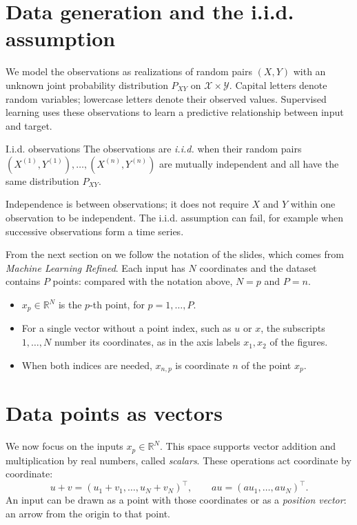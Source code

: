 \documentclass[a4paper,12pt,oneside]{report}
\begin{document}
\section{Data generation and the i.i.d. assumption}

We model the observations as realizations of random pairs $(X,Y)$
with an unknown joint probability distribution $P_{XY}$ on
$\mathcal{X}\times\mathcal{Y}$. Capital letters denote random variables;
lowercase letters denote their observed values. Supervised learning
uses these observations to learn a predictive relationship between
input and target.

\begin{frameddefn}{I.i.d. observations}
\label{def:iid}
The observations are \emph{i.i.d.} when their random pairs
$(X^{(1)},Y^{(1)}),\ldots,(X^{(n)},Y^{(n)})$ are mutually independent
and all have the same distribution $P_{XY}$.
\end{frameddefn}

Independence is between observations; it does not require $X$ and $Y$
within one observation to be independent. The i.i.d. assumption can fail,
for example when successive observations form a time series.

\begin{notebox}
From the next section on we follow the notation of the slides, which
comes from \emph{Machine Learning Refined}. Each input has $N$
coordinates and the dataset contains $P$ points: compared with the
notation above, $N=p$ and $P=n$.
\begin{itemize}
  \item $x_p\in\mathbb{R}^{N}$ is the $p$-th point, for $p=1,\ldots,P$.
  \item For a single vector without a point index, such as $u$ or $x$,
        the subscripts $1,\ldots,N$ number its coordinates, as in the
        axis labels $x_1,x_2$ of the figures.
  \item When both indices are needed, $x_{n,p}$ is coordinate $n$ of the
        point $x_p$.
\end{itemize}
\end{notebox}

\clearpage
\section{Data points as vectors}

We now focus on the inputs $x_p\in\mathbb{R}^{N}$. This space
supports vector addition and multiplication by real numbers, called
\emph{scalars}. These operations act coordinate by coordinate:
\[
  u+v=(u_1+v_1,\ldots,u_N+v_N)^\top,
  \qquad
  a u=(a u_1,\ldots,a u_N)^\top.
\]
An input can be drawn as a point with those coordinates or as a
\emph{position vector}: an arrow from the origin to that point.
\end{document}
